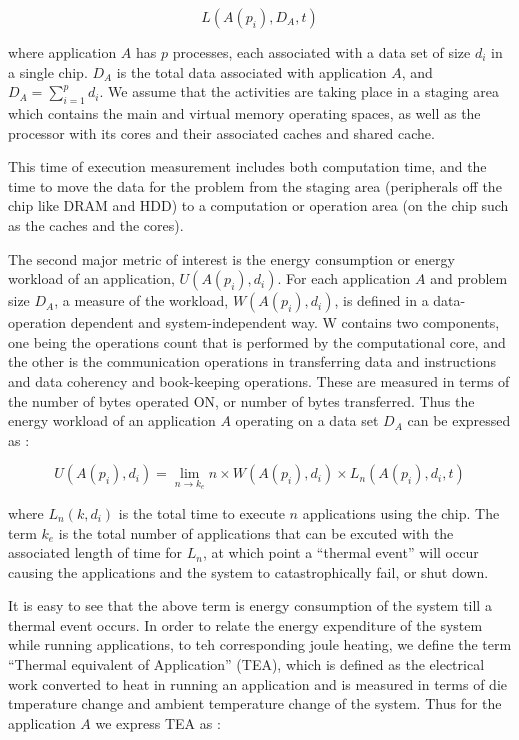 \documentclass[times,12pt,onecolumn]{article}
\begin{document}
\begin{equation}
L(A(p_i),D_A,t)\nonumber
\end{equation}

where application $A$ has $p$ processes, each associated with a data set
of size $d_i$ in a single chip. $D_A$ is the total data associated with
application $A$, and $D_A = \sum_{i=1}^p{d_i}$.  We assume that the
activities are taking place in a staging area which contains the main
and virtual memory operating spaces, as well as the processor with its
cores and their associated caches and shared cache.

This time of execution measurement includes both computation time, and
the time to move the data for the problem from the staging area
(peripherals off the chip like DRAM and HDD) to a computation or
operation area (on the chip such as the caches and the cores).

The second major metric of interest is the energy consumption or energy
workload of an application, $U(A(p_i),d_i)$. For each application $A$
and problem size $D_A$, a measure of the workload, $W(A(p_i),d_i)$, is
defined in a data-operation dependent and system-independent way. W
contains two components, one being the operations count that is
performed by the computational core, and the other is the communication
operations in transferring data and instructions and data coherency and
book-keeping operations. These are measured in terms of the number of
bytes operated ON, or number of bytes transferred. Thus the energy
workload of an application $A$ operating on a data set $D_A$ can be
expressed as :

\begin{equation}
U(A(p_i),d_i) = \displaystyle \lim_{n \to k_e }n \times W(A(p_i),d_i) \times L_n(A(p_i),d_i,t) \nonumber
\end{equation}

where $L_n(k, d_i)$ is the total time to execute $n$ applications using
the chip. The term $k_e$ is the total number of applications that can be
excuted with the associated length of time for $L_n$, at which point a
``thermal event'' will occur causing the applications and the system to
catastrophically fail, or shut down.

It is easy to see that the above term is energy consumption of the
system till a thermal event occurs. In order to relate the energy
expenditure of the system while running applications, to teh
corresponding joule heating, we define the term ``Thermal equivalent of
Application'' (TEA), which is defined as the electrical work converted
to heat in running an application and is measured in terms of die
tmperature change and ambient temperature change of the system. Thus for
the application $A$ we express TEA as :
\end{document}
